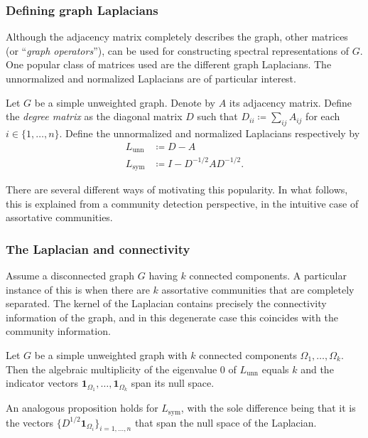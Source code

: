 \documentclass[../../main.tex]{subfiles} %
\begin{document}
\subsubsection{Defining graph Laplacians}  %
Although the adjacency matrix completely describes the graph, other matrices 
(or ``\textit{graph operators}''), can be used for constructing spectral 
representations of \(G\). One popular class of matrices used are the different 
graph Laplacians. The unnormalized and normalized Laplacians are of particular 
interest.
\begin{definition}
	Let \(G\) be a simple unweighted graph. Denote by \(A\) its adjacency 
	matrix. Define the \textit{degree matrix} as the diagonal matrix \(D\) such 
	that \(D_{ii} \coloneqq \sum_{ij} A_{ij}\) for each \(i \in \{1, \dots, n\}\). 
	Define the unnormalized and normalized Laplacians respectively by
	\begin{equation}
		\begin{aligned}
			L_{\text{unn}} &\coloneqq D - A \\
			L_{\text{sym}} &\coloneqq I - D^{-1/2} A D^{-1/2}.
		\end{aligned}
	\end{equation}
\end{definition}
There are several different ways of motivating this popularity. In what follows, 
this is explained from a community detection perspective, in the intuitive case 
of assortative communities. 

\subsubsection{The Laplacian and connectivity}  %
Assume a disconnected graph \(G\) having \(k\) connected components. A 
particular instance of this is when there are \(k\) assortative communities that 
are completely separated. The kernel of the Laplacian contains precisely the 
connectivity information of the graph, and in this degenerate case this 
coincides with the community information.
\begin{proposition}
	Let \(G\) be a simple unweighted graph with \(k\) connected components 
	\(\Omega_1, \dots, \Omega_k\). Then the algebraic multiplicity of the 
	eigenvalue \(0\) of \(L_{\text{unn}}\) equals \(k\) and the indicator vectors 
	\(\mathbf{1}_{\Omega_1}, \dots, \mathbf{1}_{\Omega_k}\) span its null 
	space.
\end{proposition}
\begin{remark}
An analogous proposition holds for \(L_{\text{sym}}\), with the sole difference 
being that it is the vectors \(\{D^{1/2} \mathbf{1}_{\Omega_i}\}_{i = 1, \dots, 
n}\) that span the null space of the Laplacian.
\end{remark}
\end{document}
